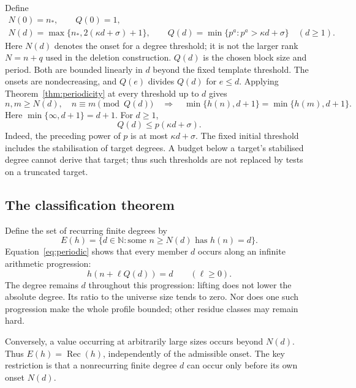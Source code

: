 \documentclass[11pt,a4paper]{article}
\theoremstyle{definition}\newtheorem{definition}[theorem]{Definition}
\theoremstyle{remark}\newtheorem{remark}[theorem]{Remark}
\newcommand{\NN}{\mathbb N}\newcommand{\N}{\mathbb N}\newcommand{\Z}{\mathbb Z}\newcommand{\Q}{\mathbb Q}\newcommand{\Fp}{\mathbb F_p}
\DeclareMathOperator{\rec}{Rec}\DeclareMathOperator{\Soc}{Soc}\DeclareMathOperator{\Top}{Top}\DeclareMathOperator{\LIS}{LIS}
\begin{document}
Define
\begin{equation}\label{eq:NQ}
 \begin{gathered}
 N(0)=n_*,\qquad Q(0)=1,\\
 N(d)=\max\{n_*,2(\kappa d+\sigma)+1\},\qquad
 Q(d)=\min\{p^a:p^a>\kappa d+\sigma\}\quad(d\ge1).
 \end{gathered}
\end{equation}
Here $N(d)$ denotes the onset for a degree threshold; it is not the
larger rank $N=n+q$ used in the deletion construction. $Q(d)$ is the
chosen block size and period. Both are bounded linearly in $d$ beyond
the fixed template threshold.
The onsets are nondecreasing, and $Q(e)$ divides $Q(d)$ for $e\le d$.
Applying Theorem~\ref{thm:periodicity} at every threshold up to $d$ gives
\begin{equation}\label{eq:periodic}
 n,m\ge N(d),\quad n\equiv m\pmod {Q(d)}
 \quad\Longrightarrow\quad
 \min\{h(n),d+1\}=\min\{h(m),d+1\}.
\end{equation}
Here $\min\{\infty,d+1\}=d+1$. For $d\ge1$,
\begin{equation}\label{eq:periodbound}
                         Q(d)\le p(\kappa d+\sigma).
\end{equation}
Indeed, the preceding power of $p$ is at most $\kappa d+\sigma$.
The fixed initial threshold includes the stabilisation of target degrees.
A budget below a target's stabilised degree cannot derive that target;
thus such thresholds are not replaced by tests on a truncated target.

\subsection{The classification theorem}
Define the set of recurring finite degrees by
\[
 E(h)=\{d\in\NN:\text{some }n\ge N(d)\text{ has }h(n)=d\}.
\]
Equation~\eqref{eq:periodic} shows that every member $d$ occurs along an
infinite arithmetic progression:
\[
                  h(n+\ell Q(d))=d\qquad(\ell\ge0).
\]
The degree remains $d$ throughout this progression: lifting does not lower the absolute degree. Its ratio to the universe size tends to zero. Nor does one such progression make the whole profile bounded; other residue classes may remain hard.

Conversely, a value occurring at arbitrarily large sizes occurs beyond
$N(d)$. Thus $E(h)=\rec(h)$, independently of the admissible onset.
The key restriction is that a nonrecurring finite degree $d$ can occur
only before its own onset $N(d)$.
\end{document}
